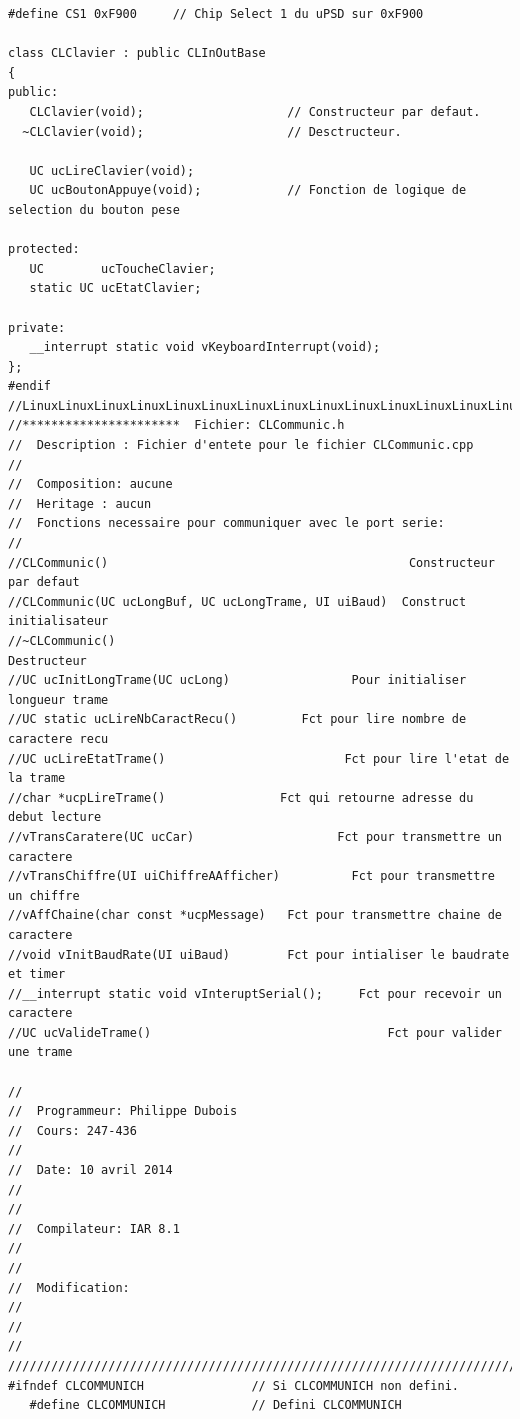 \documentclass[10pt,a4paper,final]{article}
\begin{document}
\begin{lstlisting}[label={list:first},caption=Code source]
  #define CS1 0xF900     // Chip Select 1 du uPSD sur 0xF900

class CLClavier : public CLInOutBase
{
public:
   CLClavier(void);                    // Constructeur par defaut.
  ~CLClavier(void);                    // Desctructeur.

   UC ucLireClavier(void);
   UC ucBoutonAppuye(void);            // Fonction de logique de selection du bouton pese

protected:
   UC        ucToucheClavier;
   static UC ucEtatClavier;

private:
   __interrupt static void vKeyboardInterrupt(void);
};
#endif
//LinuxLinuxLinuxLinuxLinuxLinuxLinuxLinuxLinuxLinuxLinuxLinuxLinuxLinuxLinuxTUX
//**********************  Fichier: CLCommunic.h
//  Description : Fichier d'entete pour le fichier CLCommunic.cpp
//
//  Composition: aucune
//  Heritage : aucun
//  Fonctions necessaire pour communiquer avec le port serie:
//
//CLCommunic()                                          Constructeur par defaut
//CLCommunic(UC ucLongBuf, UC ucLongTrame, UI uiBaud)  Construct initialisateur
//~CLCommunic()                                                     Destructeur
//UC ucInitLongTrame(UC ucLong)                 Pour initialiser longueur trame
//UC static ucLireNbCaractRecu()         Fct pour lire nombre de caractere recu
//UC ucLireEtatTrame()                         Fct pour lire l'etat de la trame
//char *ucpLireTrame()                Fct qui retourne adresse du debut lecture
//vTransCaratere(UC ucCar)                    Fct pour transmettre un caractere
//vTransChiffre(UI uiChiffreAAfficher)          Fct pour transmettre un chiffre
//vAffChaine(char const *ucpMessage)   Fct pour transmettre chaine de caractere
//void vInitBaudRate(UI uiBaud)        Fct pour intialiser le baudrate et timer
//__interrupt static void vInteruptSerial();     Fct pour recevoir un caractere
//UC ucValideTrame()                                 Fct pour valider une trame

//
//  Programmeur: Philippe Dubois
//  Cours: 247-436
//
//  Date: 10 avril 2014
//                                                                           //
//  Compilateur: IAR 8.1
//                                                                           //
//  Modification:                                                            //
//                                                                           //
///////////////////////////////////////////////////////////////////////////////
#ifndef CLCOMMUNICH               // Si CLCOMMUNICH non defini.
   #define CLCOMMUNICH            // Defini CLCOMMUNICH


\end{lstlisting}
\end{document}
